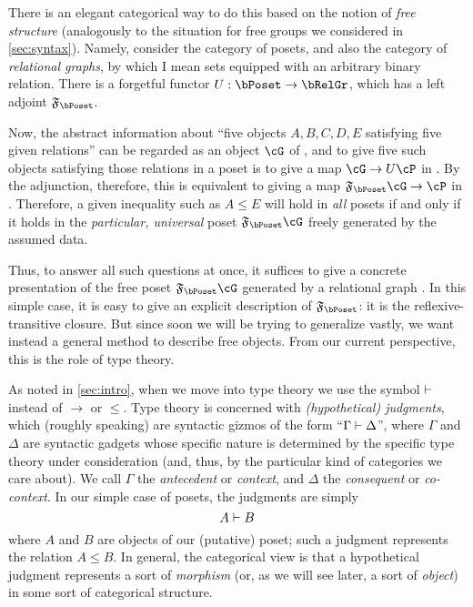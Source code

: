 There is an elegant categorical way to do this based on the notion of \emph{free structure} (analogously to the situation for free groups we considered in \cref{sec:syntax}).
Namely, consider the category \bPoset of posets, and also the category \bRelGr of \emph{relational graphs}, by which I mean sets equipped with an arbitrary binary relation.
There is a forgetful functor $U:\bPoset \to \bRelGr$, which has a left adjoint $\F\bPoset$.

Now, the abstract information about ``five objects $A,B,C,D,E$ satisfying five given relations'' can be regarded as an object $\cG$ of \bRelGr, and to give five such objects satisfying those relations in a poset \cP is to give a map $\cG \to U\cP$ in \bRelGr.
By the adjunction, therefore, this is equivalent to giving a map $\F\bPoset\cG \to \cP$ in \bPoset.
Therefore, a given inequality such as $A\le E$ will hold in \emph{all} posets if and only if it holds in the \emph{particular, universal} poset $\F\bPoset\cG$ freely generated by the assumed data.

Thus, to answer all such questions at once, it suffices to give a concrete presentation of the free poset $\F\bPoset\cG$ generated by a relational graph \cG.
In this simple case, it is easy to give an explicit description of $\F\bPoset$: it is the reflexive-transitive closure.
But since soon we will be trying to generalize vastly, we want instead a general method to describe free objects.
From our current perspective, this is the role of type theory.

As noted in \cref{sec:intro}, when we move into type theory we use the symbol $\vdash$ instead of $\to$ or $\le$.
Type theory is concerned with \emph{(hypothetical) judgments}, which (roughly speaking) are syntactic gizmos of the form ``$\Gamma\vdash\Delta$'', where $\Gamma$ and $\Delta$ are syntactic gadgets whose specific nature is determined by the specific type theory under consideration (and, thus, by the particular kind of categories we care about).
We call $\Gamma$ the \emph{antecedent} or \emph{context}, and $\Delta$ the \emph{consequent} or \emph{co-context}.
In our simple case of posets, the judgments are simply
\[ A \vdash B \]
where $A$ and $B$ are objects of our (putative) poset; such a judgment represents the relation $A\le B$.
In general, the categorical view is that a hypothetical judgment represents a sort of \emph{morphism} (or, as we will see later, a sort of \emph{object}) in some sort of categorical structure.

